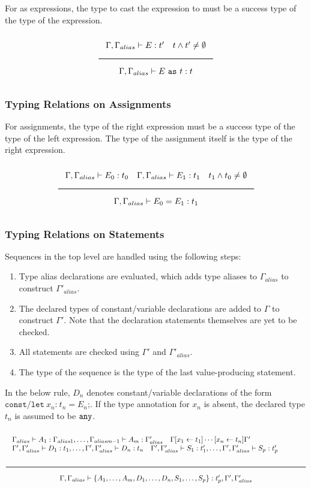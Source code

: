 For as expressions, the type to cast the expression to must be a success type of the type of the expression.

\noindent
\[
  \Rule{\Gamma, \Gamma_{alias} \vdash E : t' \quad t \wedge t' \neq \emptyset}{\Gamma, \Gamma_{alias} \vdash E\ \texttt{as}\ t : t}  
\]
\noindent

\subsubsection{Typing Relations on Assignments}

For assignments, the type of the right expression must be a success type of the type of the left expression.
The type of the assignment itself is the type of the right expression.

\noindent
\[
  \Rule{\Gamma, \Gamma_{alias} \vdash E_0 : t_0 \quad \Gamma, \Gamma_{alias} \vdash E_1 : t_1 \quad t_1 \wedge t_0 \neq \emptyset}{
    \Gamma, \Gamma_{alias} \vdash E_0 = E_1 : t_1}
\]
\noindent

\subsubsection{Typing Relations on Statements}

Sequences in the top level are handled using the following steps:

\begin{enumerate}
\item{Type alias declarations are evaluated, which adds type aliases to $\Gamma_{alias}$ to construct $\Gamma'_{alias}$.}
\item{The declared types of constant/variable declarations are added to $\Gamma$ to construct $\Gamma'$.
  Note that the declaration statements themselves are yet to be checked.}
\item{All statements are checked using $\Gamma'$ and $\Gamma'_{alias}$.}
\item{The type of the sequence is the type of the last value-producing statement.}
\end{enumerate}

In the below rule, $D_n$ denotes constant/variable declarations of the form $\texttt{const/let}\ x_n \texttt{:}\ t_n = E_n\texttt{;}$.
If the type annotation for $x_n$ is absent, the declared type $t_n$ is assumed to be $\texttt{any}$.

\[
  \Rule{\begin{minipage}{140mm}
    $\Gamma_{alias} \vdash A_1 : \Gamma_{alias1}, \ldots, \Gamma_{aliasm-1} \vdash A_m : \Gamma'_{alias} \quad
    \Gamma [x_1 \leftarrow t_1] \cdots [x_n \leftarrow t_n] \Gamma'$ \\
    $\Gamma', \Gamma'_{alias} \vdash D_1 : t_1, \ldots, \Gamma', \Gamma'_{alias} \vdash D_n : t_n \quad
    \Gamma', \Gamma'_{alias} \vdash S_1 : t'_1, \ldots, \Gamma', \Gamma'_{alias} \vdash S_p : t'_p$\\
    \end{minipage}}{
    \Gamma, \Gamma_{alias} \vdash \{ A_1, \ldots, A_m, D_1, \ldots, D_n, S_1, \ldots, S_p \} : t'_p, \Gamma', \Gamma'_{alias}}
\]

